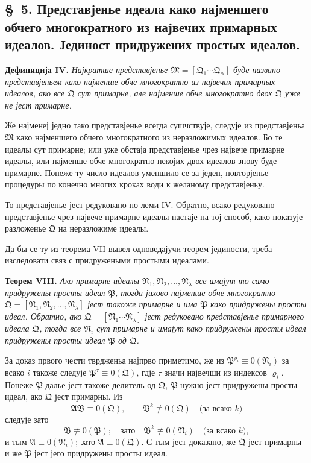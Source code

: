 ﻿\documentclass[11pt]{article}
\newcommand{\ideal}[1]{\mathfrak{#1}}
\begin{document}

\setcounter{footnote}{20}
\subsection*{\S~5. Представјенье идеала како најменшего обчего многократного из највечих примарных идеалов. Јединост придружених простых идеалов.}

\textbf{Дефиниција IV.} \emph{Најкратше представјенье \(\ideal M=[\ideal Q_1\cdots\ideal Q_\alpha]\) буде названо представјеньем како најменше обче многократно из највечих примарных идеалов, ако все \(\ideal Q\) сут примарне, але најменше обче многократно двох \(\ideal Q\) уже не јест примарне.}

Же најменеј једно тако представјенье всегда сушчствује, следује из представјеньа \(\ideal M\) како најменшего обчего многократного из неразложимых идеалов. Бо те идеалы сут примарне; или уже обстаја представјенье чрез највече примарне идеалы, или најменше обче многократно некојих двох идеалов знову буде примарне. Понеже ту число идеалов уменшило се за једен, повторјенье процедуры по конечно многих кроках води к желаному представјеньу.

То представјенье јест редуковано по леми IV. Обратно, всако редуковано представјенье чрез највече примарне идеалы настаје на тој способ, како показује разложенье \(\ideal Q\) на неразложиме идеалы.

Да бы се ту из теорема VII вывел одповедајучи теорем јединости, треба изследовати связ с придружеными простыми идеалами.

\textbf{Теорем VIII.} \emph{Ако примарне идеалы \(\ideal N_1,\ideal N_2,\ldots,\ideal N_\lambda\) все имајут то само придружены просты идеал \(\ideal P\), тогда јихово најменше обче многократно \(\ideal Q=[\ideal N_1,\ideal N_2,\ldots,\ideal N_\lambda]\) јест такоже примарне и има \(\ideal P\) како придружены просты идеал. Обратно, ако \(\ideal Q=[\ideal N_1\cdots\ideal N_\lambda]\) јест редуковано представјенье примарного идеала \(\ideal Q\), тогда все \(\ideal N_i\) сут примарне и имајут како придружены просты идеал придружены просты идеал \(\ideal P\) од \(\ideal Q\).}

За доказ првого чести тврдженьа најпрво приметимо, же из \(\ideal P^{\varrho_i}\equiv0(\ideal N_i)\) за всако \(i\) такоже следује \(\ideal P^\tau\equiv0(\ideal Q)\), гдје \(\tau\) значи највечши из индексов \(\varrho_i\). Понеже \(\ideal P\) далье јест такоже делитель од \(\ideal Q\), \(\ideal P\) нужно јест придружены просты идеал, ако \(\ideal Q\) јест примарны. Из
\[
 \ideal A\ideal B\equiv0(\ideal Q),\qquad
 \ideal B^k\not\equiv0(\ideal Q)\quad\text{(за всако }k)
\]
следује зато
\[
 \ideal B\not\equiv0(\ideal P);
 \quad\text{зато}\quad
 \ideal B^k\not\equiv0(\ideal N_i)\quad\text{(за всако }k),
\]
и тым \(\ideal A\equiv0(\ideal N_i)\); зато \(\ideal A\equiv0(\ideal Q)\). С тым јест доказано, же \(\ideal Q\) јест примарны и же \(\ideal P\) јест јего придружены просты идеал.
\end{document}
